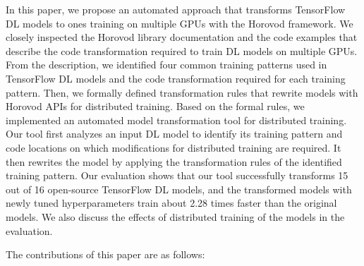 In this paper, we propose an automated approach that transforms TensorFlow DL
models to ones training on multiple GPUs with the Horovod framework.
We closely inspected the Horovod library documentation and the code examples
that describe the code transformation required to train DL models on multiple
GPUs.
From the description, we identified four common training patterns used in
TensorFlow DL models and the code transformation required for each training
pattern.
Then, we formally defined transformation rules that rewrite models with Horovod
APIs for distributed training.
Based on the formal rules, we implemented an automated model transformation
tool for distributed training.
Our tool first analyzes an input DL model to identify its training
pattern and code locations on which modifications for distributed training
are required.
It then rewrites the model by applying the transformation rules of the
identified training pattern.
Our evaluation shows that our tool successfully transforms 15 out of 16
open-source TensorFlow DL models, and the transformed models with newly tuned
hyperparameters train about 2.28 times faster than the original models.
We also discuss the effects of distributed training of the models in the
evaluation.



The contributions of this paper are as follows:

